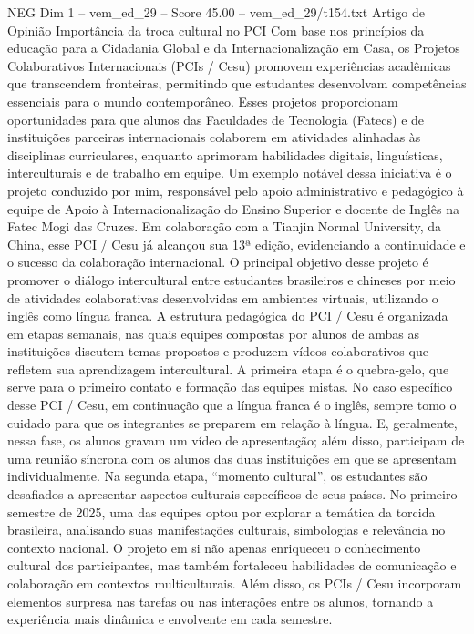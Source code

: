 \begin{textsample}{NEG Dim 1 – vem\_ed\_29 – Score 45.00 – vem\_ed\_29/t154.txt}  \label{ex:f1_neg_168}
Artigo de Opinião Importância da troca cultural no PCI Com base nos princípios da educação para a Cidadania Global e da Internacionalização em Casa, os Projetos Colaborativos Internacionais (PCIs / Cesu) promovem experiências acadêmicas que transcendem fronteiras, permitindo que estudantes desenvolvam competências essenciais para o mundo contemporâneo.
Esses projetos proporcionam oportunidades para que alunos das Faculdades de Tecnologia (Fatecs) e de instituições parceiras internacionais colaborem em atividades alinhadas às disciplinas curriculares, enquanto aprimoram habilidades digitais, linguísticas, interculturais e de trabalho em equipe.
Um exemplo notável dessa iniciativa é o projeto conduzido por mim, responsável pelo apoio administrativo e pedagógico à equipe de Apoio à Internacionalização do Ensino Superior e docente de Inglês na Fatec Mogi das Cruzes.
Em colaboração com a Tianjin Normal University, da China, esse PCI / Cesu já alcançou sua 13ª edição, evidenciando a continuidade e o sucesso da colaboração internacional.
O principal objetivo desse projeto é promover o diálogo intercultural entre estudantes brasileiros e chineses por meio de atividades colaborativas desenvolvidas em ambientes virtuais, utilizando o inglês como língua franca.
A estrutura pedagógica do PCI / Cesu é organizada em etapas semanais, nas quais equipes compostas por alunos de ambas as instituições discutem temas propostos e produzem vídeos colaborativos que refletem sua aprendizagem intercultural.
A primeira etapa é o quebra-gelo, que serve para o primeiro contato e formação das equipes mistas.
No caso específico desse PCI / Cesu, em continuação que a língua franca é o inglês, sempre tomo o cuidado para que os integrantes se preparem em relação à língua.
E, geralmente, nessa fase, os alunos gravam um vídeo de apresentação; além disso, participam de uma reunião síncrona com os alunos das duas instituições em que se apresentam individualmente.
Na segunda etapa, “momento cultural”, os estudantes são desafiados a apresentar aspectos culturais específicos de seus países.
No primeiro semestre de 2025, uma das equipes optou por explorar a temática da torcida brasileira, analisando suas manifestações culturais, simbologias e relevância no contexto nacional.
O projeto em si não apenas enriqueceu o conhecimento cultural dos participantes, mas também fortaleceu habilidades de comunicação e colaboração em contextos multiculturais.
Além disso, os PCIs / Cesu incorporam elementos surpresa nas tarefas ou nas interações entre os alunos, tornando a experiência mais dinâmica e envolvente em cada semestre.

\end{textsample}
